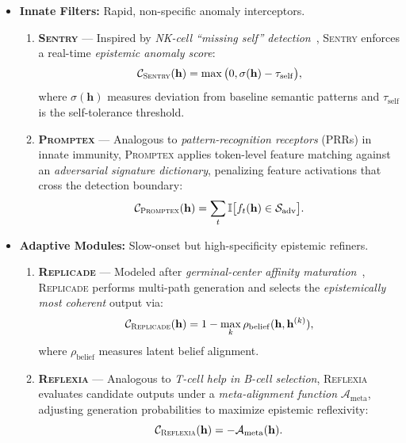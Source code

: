 \begin{itemize}
    \item \textbf{Innate Filters:} Rapid, non-specific anomaly interceptors.
    \begin{enumerate}
        \item \textbf{\textsc{Sentry}} — Inspired by \emph{NK-cell ``missing self'' detection}~\cite{vivier2011innate}, \textsc{Sentry} enforces a real-time \emph{epistemic anomaly score}:
        \[
        \mathcal{C}_{\textsc{Sentry}}(\mathbf{h}) = \max\big(0, \sigma(\mathbf{h}) - \tau_\mathrm{self}\big),
        \]
        where $\sigma(\mathbf{h})$ measures deviation from baseline semantic patterns and $\tau_\mathrm{self}$ is the self-tolerance threshold.

        \item \textbf{\textsc{Promptex}} — Analogous to \emph{pattern-recognition receptors} (PRRs) in innate immunity, \textsc{Promptex} applies token-level feature matching against an \emph{adversarial signature dictionary}, penalizing feature activations that cross the detection boundary:
        \[
        \mathcal{C}_{\textsc{Promptex}}(\mathbf{h}) = \sum_{t} \mathbb{I}\big[f_t(\mathbf{h}) \in \mathcal{S}_\mathrm{adv}\big].
        \]
    \end{enumerate}

    \item \textbf{Adaptive Modules:} Slow-onset but high-specificity epistemic refiners.
    \begin{enumerate}
        \item \textbf{\textsc{Replicade}} — Modeled after \emph{germinal-center affinity maturation}~\cite{kelsoe1996life}, \textsc{Replicade} performs multi-path generation and selects the \emph{epistemically most coherent} output via:
        \[
        \mathcal{C}_{\textsc{Replicade}}(\mathbf{h}) = 1 - \max_{k} \rho_\mathrm{belief}(\mathbf{h}, \mathbf{h}^{(k)}),
        \]
        where $\rho_\mathrm{belief}$ measures latent belief alignment.

        \item \textbf{\textsc{Reflexia}} — Analogous to \emph{T-cell help in B-cell selection}, \textsc{Reflexia} evaluates candidate outputs under a \emph{meta-alignment function} $\mathcal{A}_\mathrm{meta}$, adjusting generation probabilities to maximize epistemic reflexivity:
        \[
        \mathcal{C}_{\textsc{Reflexia}}(\mathbf{h}) = - \mathcal{A}_\mathrm{meta}(\mathbf{h}).
        \]
    \end{enumerate}


\end{itemize}
